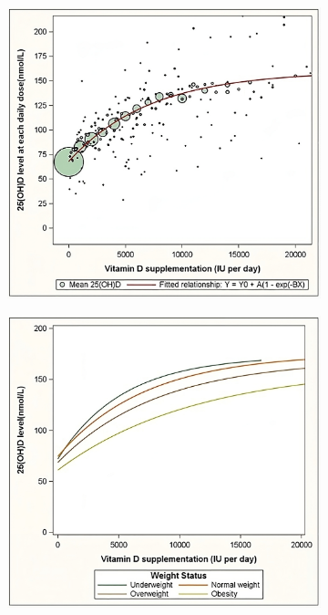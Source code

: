 \documentclass[
  a4paper,
  DIV=11,
  numbers=noendperiod,
  listof=totoc]{scrreprt}
\begin{document}
\begin{figure}[H]
    \centering
    \begin{subfigure}{0.48\textwidth}
        \centering
        \includegraphics[width=\textwidth]{figures/ekwaru-dose-relation-transformed.jpg}
        \label{subfig:vd-dose-response}
    \end{subfigure}
    \hfill
    \begin{subfigure}{0.48\textwidth}
        \centering
        \includegraphics[width=\textwidth]{figures/ekwaru-dose-imc-transformed.jpg}

\end{subfigure}
\end{figure}
\end{document}

